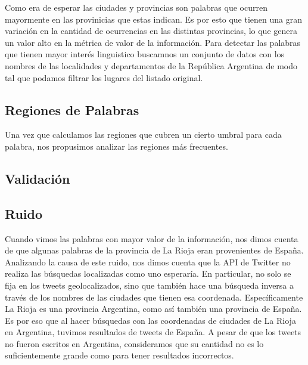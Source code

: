Como era de esperar las ciudades y provincias son palabras que ocurren mayormente en las provinicias que estas indican. Es por esto que tienen una gran variación en 
la cantidad de ocurrencias en las distintas provincias, lo que genera un valor alto en la métrica de valor de la información. Para detectar las palabras que tienen 
mayor interés linguistico buscamnos un conjunto de datos con los nombres de las localidades y departamentos de la República Argentina de modo tal que podamos filtrar 
los lugares del listado original.


\subsection{Regiones de Palabras} %
\label{sub:regiones_de_palabras}

Una vez que calculamos las regiones que cubren un cierto umbral para cada palabra, nos propusimos analizar las regiones más frecuentes.

\subsection{Validación}

\subsection{Ruido} %
\label{ssub:ruido}

Cuando vimos las palabras con mayor valor de la información, nos dimos cuenta de que algunas palabras de la provincia de La Rioja eran provenientes de España. Analizando la causa de este ruido, nos dimos cuenta que la API de Twitter no realiza las búsquedas localizadas como uno esperaría. En particular, no solo se fija en los tweets geolocalizados, sino que también hace una búsqueda inversa a través de los nombres de las ciudades que tienen esa coordenada. Específicamente La Rioja es una provincia Argentina, como así también una provincia de España. Es por eso que al hacer búsquedas con las coordenadas de ciudades de La Rioja en Argentina, tuvimos resultados de tweets de España. A pesar de que los tweets no fueron escritos en Argentina, consideramos que su cantidad no es lo suficientemente grande como para tener resultados incorrectos.